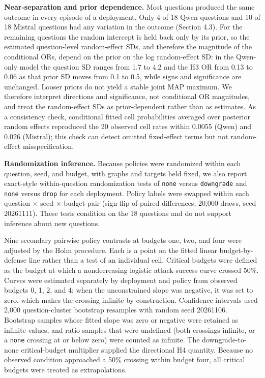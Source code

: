 \documentclass[11pt]{article}
\begin{document}
\textbf{Near-separation and prior dependence.} Most questions produced the same outcome in every episode of a deployment. Only 4 of 18 Qwen questions and 10 of 18 Mistral questions had any variation in the outcome (Section 4.3). For the remaining questions the random intercept is held back only by its prior, so the estimated question-level random-effect SDs, and therefore the magnitude of the conditional ORs, depend on the prior on the log random-effect SD: in the Qwen-only model the question SD ranges from 1.7 to 4.2 and the H3 OR from 0.13 to 0.06 as that prior SD moves from 0.1 to 0.5, while signs and significance are unchanged. Looser priors do not yield a stable joint MAP maximum. We therefore interpret directions and significance, not conditional OR magnitudes, and treat the random-effect SDs as prior-dependent rather than as estimates. As a consistency check, conditional fitted cell probabilities averaged over posterior random effects reproduced the 20 observed cell rates within 0.0055 (Qwen) and 0.026 (Mistral); this check can detect omitted fixed-effect terms but not random-effect misspecification.

\textbf{Randomization inference.} Because policies were randomized within each question, seed, and budget, with graphs and targets held fixed, we also report exact-style within-question randomization tests of \texttt{none} versus \texttt{downgrade} and \texttt{none} versus \texttt{drop} for each deployment. Policy labels were swapped within each question × seed × budget pair (sign-flip of paired differences, 20,000 draws, seed 20261111). These tests condition on the 18 questions and do not support inference about new questions.

Nine secondary pairwise policy contrasts at budgets one, two, and four were adjusted by the Holm procedure. Each is a point on the fitted linear budget-by-defense line rather than a test of an individual cell. Critical budgets were defined as the budget at which a nondecreasing logistic attack-success curve crossed 50\%. Curves were estimated separately by deployment and policy from observed budgets 0, 1, 2, and 4; when the unconstrained slope was negative, it was set to zero, which makes the crossing infinite by construction. Confidence intervals used 2,000 question-cluster bootstrap resamples with random seed 20261106. Bootstrap samples whose fitted slope was zero or negative were retained as infinite values, and ratio samples that were undefined (both crossings infinite, or a \texttt{none} crossing at or below zero) were counted as infinite. The downgrade-to-none critical-budget multiplier supplied the directional H4 quantity. Because no observed condition approached a 50\% crossing within budget four, all critical budgets were treated as extrapolations.
\end{document}
